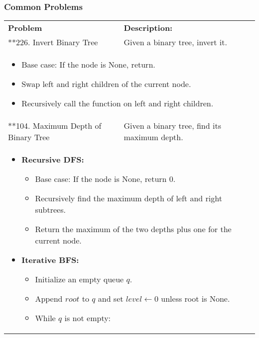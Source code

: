 \subsubsection{Common Problems}
\begin{summary}
    \begin{center}
        \begin{tabular}{ll}
            \toprule
            \textbf{Problem} & \textbf{Description:} \\
            **226. Invert Binary Tree & Given a binary tree, invert it. \\
            \multicolumn{2}{p{\linewidth}}{
                \begin{itemize}
                    \item Base case: If the node is None, return.
                    \item Swap left and right children of the current node.
                    \item Recursively call the function on left and right children.
                \end{itemize}
            } \\
            \midrule
            **104. Maximum Depth of Binary Tree & Given a binary tree, find its maximum depth. \\
            \multicolumn{2}{p{\linewidth}}{
                \begin{itemize}
                    \item \textbf{Recursive DFS:}
                    \begin{itemize}
                        \item Base case: If the node is None, return 0.
                        \item Recursively find the maximum depth of left and right subtrees.
                        \item Return the maximum of the two depths plus one for the current node.
                    \end{itemize}
                    \item \textbf{Iterative BFS:}
                    \begin{itemize}
                        \item Initialize an empty queue $q$.
                        \item Append $root$ to $q$ and set $level \gets 0$ unless root is None.
                        \item While $q$ is not empty:
                        \begin{itemize}

\end{itemize}
\end{itemize}
\end{itemize}}
\end{tabular}
\end{center}
\end{summary}
